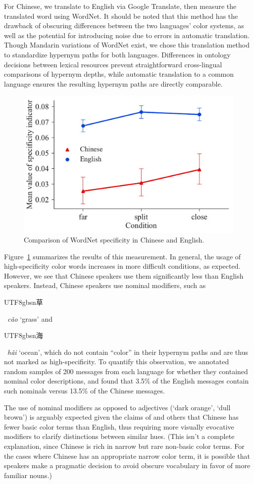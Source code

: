\documentclass[11pt,a4paper]{article}
\newenvironment{zh}{\begin{CJK}{UTF8}{gbsn}}{\end{CJK}}
\newcommand{\textzh}[2]{\begin{zh}#1\end{zh}~\emph{#2}}
\renewcommand{\|}{\mid}
\newcommand{\Figref}[1]{Figure~\ref{#1}}
\begin{document}
For Chinese, we translate to English via Google Translate, then measure the translated word using WordNet. It should be noted that this method has the drawback of obscuring differences between the two languages' color systems, as well as the potential for introducing noise due to errors in automatic translation. Though Mandarin variations of WordNet exist, we chose this translation method to standardize hypernym paths for both languages. Differences in ontology decisions between lexical resources prevent straightforward cross-lingual comparisons of hypernym depths, while automatic translation to a common language ensures the resulting hypernym paths are directly comparable.

\begin{figure}[!t]
    \centering
    \includegraphics[width=0.8\columnwidth]{specificity.pdf}
    \caption{Comparison of WordNet specificity in Chinese and English.}
    \label{fig:specificity}
\end{figure}

\Figref{fig:specificity} summarizes the results of this measurement. In general, the usage of high-specificity color words increases in more difficult conditions, as expected. However, we see that Chinese speakers use them significantly less than English speakers. Instead, Chinese speakers use nominal modifiers, such as \textzh{草}{c\v{a}o} `grass' and \textzh{海}{h\v{a}i} `ocean', which do not contain ``color'' in their hypernym paths and are thus not marked as high-specificity. 
To quantify this observation, we annotated random samples of 200 messages from each language for whether they contained nominal color descriptions, and found that 3.5\% of the English messages contain such nominals versus 13.5\% of the Chinese messages.

The use of nominal modifiers as opposed to adjectives (`dark orange', `dull brown') is arguably expected given the claims of \citet{BerlinKay1969} and others that Chinese has fewer basic color terms than English, thus requiring more visually evocative modifiers to clarify distinctions between similar hues. (This isn't a complete explanation, since Chinese is rich in narrow but rare non-basic color terms. For the cases where Chinese has an appropriate narrow color term, it is possible that speakers make a pragmatic decision to avoid obscure vocabulary in favor of more familiar nouns.)
\end{document}

